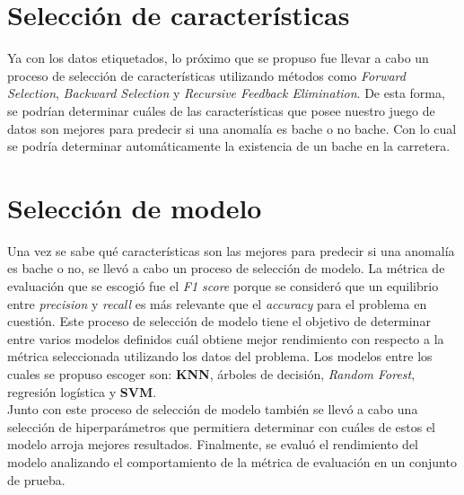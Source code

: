 \section{Selección de características}
	Ya con los datos etiquetados, lo próximo que se propuso fue llevar a cabo un proceso de selección de características utilizando métodos como
	\emph{Forward Selection}, \emph{Backward Selection} y \emph{Recursive Feedback Elimination}. De esta forma, se podrían determinar cuáles de las 
	características que posee nuestro juego de datos son mejores para predecir si una anomalía es bache o no bache. Con lo cual se podría determinar
	automáticamente la existencia de un bache en la carretera.

\section{Selección de modelo}
	Una vez se sabe qué características son las mejores para predecir si una anomalía es bache o no, se llevó a cabo un proceso de selección de
	modelo. La métrica de evaluación que se escogió fue el \emph{F1 score} porque se consideró que un equilibrio entre \emph{precision} y
	\emph{recall} es más relevante que el \emph{accuracy} para el problema en cuestión. Este proceso de selección de modelo tiene el
	objetivo de determinar entre varios modelos definidos cuál obtiene mejor rendimiento con respecto a la métrica seleccionada utilizando los datos
	del problema. Los modelos entre los cuales se propuso escoger son: \textbf{KNN}, árboles de decisión, \emph{Random Forest}, regresión logística y
	\textbf{SVM}.\\
	\indent Junto con este proceso de selección de modelo también se llevó a cabo una selección de hiperparámetros que permitiera determinar con
	cuáles de estos el modelo arroja mejores resultados. Finalmente, se evaluó el rendimiento del modelo analizando el comportamiento de la métrica
	de evaluación en un conjunto de prueba.
